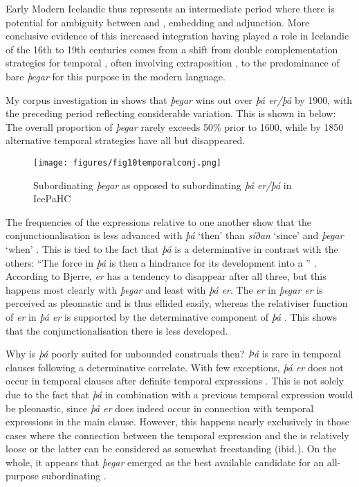 \documentclass[output=paper,colorlinks,citecolor=brown]{langscibook}
\begin{document}
Early Modern Icelandic thus represents an intermediate period where there is potential for ambiguity between  and , embedding and adjunction. More conclusive evidence of this increased integration having played a role in Icelandic of the 16th to 19th centuries comes from a shift from double complementation strategies for temporal , often involving extraposition \citep{sapp2019arrested, wallenberg2016extraposition}, to the predominance of bare \textit{þegar} for this purpose in the modern language. 

My corpus investigation in  shows that \textit{þegar} wins out over \textit{þá er/þá} by 1900, with the preceding period reflecting considerable  variation. This is shown in  below: The overall proportion of \textit{þegar} rarely exceeds 50\% prior to 1600, while by 1850 alternative temporal  strategies have all but disappeared.


\begin{figure}
  \centering
 \texttt{[image: figures/fig10temporalconj.png]}
    \caption{Subordinating \textit{þegar} as opposed to subordinating \textit{þá er/þá} in IcePaHC}\label{ex:thaandthegarsubord}
\end{figure}

The frequencies of the expressions relative to one another show that the conjunctionalisation is less advanced with \textit{þá} `then' than \textit{síðan} `since' and \textit{þegar} `when' \citep{Bjerre1935}. This is tied to the fact that \textit{þá} is a determinative  in contrast with the others: “The  force in \textit{þá} is then a hindrance for its development into a ” \citep[156]{Bjerre1935}. According to Bjerre, \textit{er} has a tendency to disappear after all three, but this happens most clearly with \textit{þegar} and least with \textit{þá er}. The \textit{er} in \textit{þegar er} is perceived as pleonastic and is thus ellided easily, whereas the relativiser function of \textit{er} in \textit{þá er} is supported by the determinative component of \textit{þá} \citep{Bjerre1935}. This shows that the conjunctionalisation there is less developed.

Why is \textit{þá} poorly suited for unbounded construals then? \textit{Þá} is rare in temporal clauses following a determinative correlate. With few exceptions, \textit{þá er} does not occur in temporal clauses after definite temporal expressions \citep{Bjerre1935}. This is not solely due to the fact that \textit{þá} in combination with a previous temporal expression would be pleonastic, since \textit{þá er} does indeed occur in connection with temporal expressions in the main clause. However, this happens nearly exclusively in those cases where the connection between the temporal expression and the  is relatively loose or the latter can be considered as somewhat freestanding (ibid.). On the whole, it appears that \textit{þegar} emerged as the best available candidate for an all-purpose subordinating .
\end{document}
